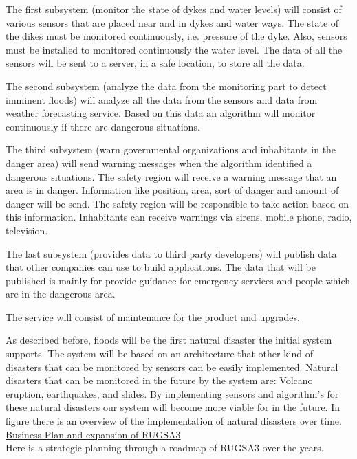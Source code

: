 The first subsystem (monitor the state of dykes and water levels) will consist of various sensors that are placed near and in dykes and water ways. The state of the dikes must be monitored continuously, i.e. pressure of the dyke. Also, sensors must be installed to monitored continuously the water level. The data of all the sensors will be sent to a server, in a safe location, to store all the data.

The second subsystem (analyze the data from the monitoring part to detect imminent floods) will analyze all the data from the sensors and data from weather forecasting service. Based on this data an algorithm will monitor continuously if there are dangerous situations.

The third subsystem (warn governmental organizations and inhabitants in the danger area) will send warning messages when the algorithm identified a dangerous situations. The safety region will receive a warning message that an area is in danger. Information like position, area, sort of danger and amount of danger will be send. The safety region will be responsible to take action based on this information. Inhabitants can receive warnings via sirens, mobile phone, radio, television. %

The last subsystem (provides data to third party developers) will publish data that other companies can use to build applications. The data that will be published is mainly for provide guidance for emergency services and people which are in the dangerous area. 

The service will consist of maintenance for the product and upgrades.

As described before, floods will be the first natural disaster the initial system supports. The system will be based on an architecture that other kind of disasters that can be monitored by sensors can be easily implemented. Natural disasters that can be monitored in the future by the system are: Volcano eruption, earthquakes, and slides. By implementing sensors and algorithm's for these natural disasters our system will become more viable for in the future. In figure 
there is an overview of the implementation of natural disasters over time. \\

\underline{Business Plan and expansion of RUGSA3} \\

Here is a strategic planning through a roadmap of RUGSA3 over the years.

